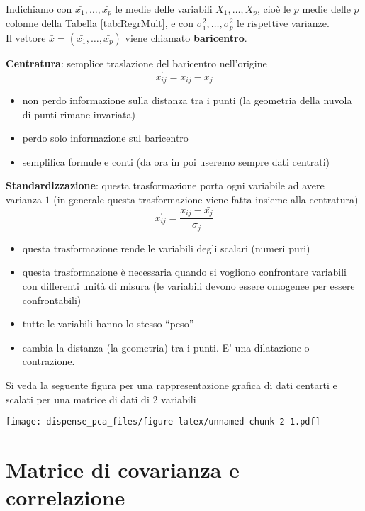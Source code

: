 \documentclass[
  11pt,
]{book}
\providecommand{\tightlist}{%
  \setlength{\itemsep}{0pt}\setlength{\parskip}{0pt}}
\begin{document}
Indichiamo con \(\bar{x_1},\dots,\bar{x_p}\) le medie delle variabili \(X_1,\dots,X_p\),
cioè le \(p\) medie delle \(p\) colonne della Tabella \ref{tab:RegrMult}, e con
\(\sigma_1^2,\dots,\sigma_p^2\) le rispettive varianze.\\
Il vettore \(\bar{x}=(\bar{x_1},\dots,\bar{x_p})\) viene chiamato \textbf{baricentro}.

\textbf{Centratura}: semplice traslazione del baricentro nell'origine
\begin{equation}
x_{ij}^{'}=x_{ij}-\bar{x_j}
\end{equation}

\begin{itemize}
\tightlist
\item
  non perdo informazione sulla distanza tra i punti (la geometria della nuvola di punti
  rimane invariata)
\item
  perdo solo informazione sul baricentro
\item
  semplifica formule e conti (da ora in poi useremo sempre dati centrati)
\end{itemize}

\textbf{Standardizzazione}: questa trasformazione porta ogni variabile ad avere varianza \(1\)
(in generale questa trasformazione viene fatta insieme alla centratura)
\begin{equation}
x_{ij}^{'}=\frac{x_{ij}-\bar{x_j}}{\sigma_j}
\end{equation}

\begin{itemize}
\tightlist
\item
  questa trasformazione rende le variabili degli scalari (numeri puri)
\item
  questa trasformazione è necessaria quando si vogliono confrontare variabili
  con differenti unità di misura (le variabili devono essere omogenee per essere confrontabili)
\item
  tutte le variabili hanno lo stesso ``peso''
\item
  cambia la distanza (la geometria) tra i punti. E' una dilatazione o contrazione.
\end{itemize}

Si veda la seguente figura per una rappresentazione grafica di dati centarti e
scalati per una matrice di dati di \(2\) variabili

\texttt{[image: dispense\_pca\_files/figure-latex/unnamed-chunk-2-1.pdf]}

\hypertarget{matrice-di-covarianza-e-correlazione}{%
\section{Matrice di covarianza e correlazione}\label{matrice-di-covarianza-e-correlazione}}
\end{document}
